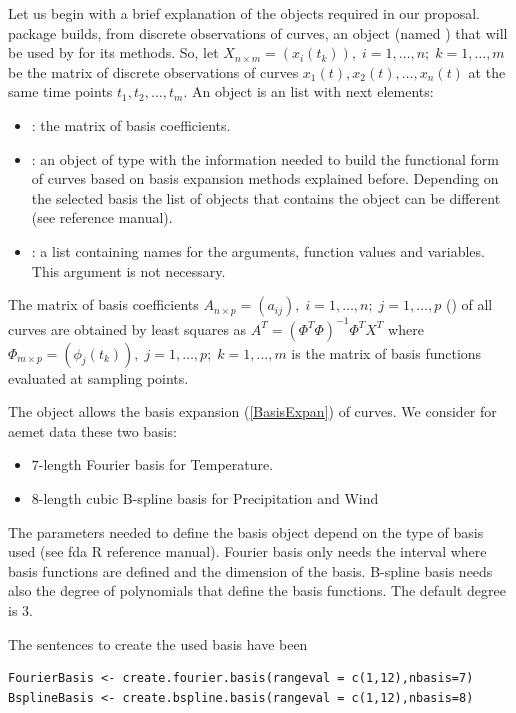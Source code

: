 Let us begin with a brief explanation of the  objects required in our proposal.  package builds, from discrete observations of curves, an  object (named ) that will be used by  for its methods. So, let $X_{n\times m}=(x_i(t_k)),\; i=1,\ldots,n;\; k=1,\ldots,m$ be the matrix of discrete observations of curves $x_{1}\left( t\right) ,x_{2}\left( t\right) ,\ldots ,x_{n}\left( t\right) $ at the same time points $t_{1},t_{2},\ldots ,t_{m}$. An  object is an  list with next elements:
\begin{itemize}
\item {}: the matrix of basis coefficients.
\item {}: an object of type  with the information needed to build the functional form of curves based on basis expansion methods explained before. Depending on the selected basis the list of objects that contains the  object can be different (see  reference manual).
\item {}: a list containing names for the arguments, function values and variables. This argument is not necessary.
\end{itemize}
The matrix of basis coefficients $A_{n \times p}=(a_{ij}), \; i=1,\ldots,n;\; j=1,\ldots,p$ () of all curves are obtained by least squares as $A^{T}=\left( \Phi ^{T}\Phi \right) ^{-1}\Phi ^{T}X^{T}$
where  $\Phi_{m \times p} = (\phi _{j}\left( t_{k}\right)),\; j=1,\ldots,p; \; k=1,\ldots,m$ is the matrix of basis functions evaluated at sampling points.

The  object allows the basis expansion (\ref{BasisExpan}) of curves. We consider for aemet data these two basis:
\begin{itemize}
 \item $7$-length Fourier basis for Temperature.
 \item $8$-length cubic B-spline basis for Precipitation and Wind
\end{itemize}
The  parameters needed to define the basis object depend on the type of basis used (see fda R reference manual). Fourier basis only needs the interval where basis functions are defined and the dimension of the basis. B-spline basis needs also the degree of polynomials that define the basis functions. The default degree is 3.

The sentences to create the used basis have been

\begin{verbatim}
FourierBasis <- create.fourier.basis(rangeval = c(1,12),nbasis=7)
BsplineBasis <- create.bspline.basis(rangeval = c(1,12),nbasis=8)
\end{verbatim}

